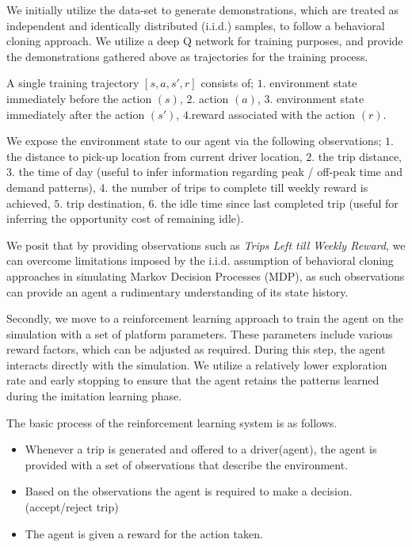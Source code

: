 \documentclass[runningheads]{llncs}
\begin{document}
We initially utilize the data-set to generate demonstrations, which are treated as independent and identically distributed (i.i.d.) samples, to follow a behavioral cloning approach. We utilize a deep Q network \cite{Hausknecht2015DeepRQ} for training purposes, and provide the demonstrations gathered above as trajectories for the training process. 

A single training trajectory \([s,a,s',r]\) consists of; \(1.\) environment state immediately before the action \((s)\), \(2.\) action \((a)\), \(3.\) environment state immediately after the action \((s')\), \(4.\)reward associated with the action \((r)\).

We expose the environment state to our agent via the following observations; \(1.\) the distance to pick-up location from current driver location, \(2.\) the trip distance, \(3.\) the time of day (useful to infer information regarding peak / off-peak time and demand patterns), \(4.\) the number of trips to complete till weekly reward is achieved, \(5.\) trip destination, \(6.\) the idle time since last completed trip (useful for inferring the opportunity cost of remaining idle).

We posit that by providing observations such as \emph{Trips Left till Weekly Reward}, we can overcome limitations imposed by the i.i.d. assumption of behavioral cloning approaches in simulating Markov Decision Processes (MDP), as such observations can provide an agent a rudimentary understanding of its state history. 

Secondly, we move to a reinforcement learning approach to train the agent on the simulation with a set of platform parameters. These parameters include various reward factors, which can be adjusted as required. During this step, the agent interacts directly with the simulation. We utilize a relatively lower exploration rate and early stopping to ensure that the agent retains the patterns learned during the imitation learning phase. 

The basic process of the reinforcement learning system is as follows.

\begin{itemize}
\item Whenever a trip is generated and offered to a driver(agent), the agent is provided with a set of observations that describe the environment.
\item Based on the observations the agent is required to make a decision. (accept/reject trip)
\item The agent is given a reward for the action taken.
\end{itemize}
\end{document}

